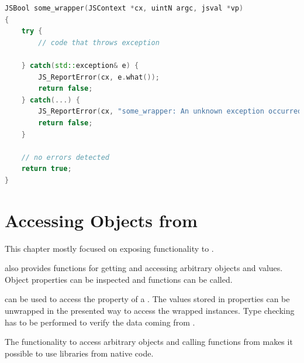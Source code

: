 \SingleSpacing
\begin{lstlisting}[language=C++, caption=Error handling at the language border]
JSBool some_wrapper(JSContext *cx, uintN argc, jsval *vp)
{
	try {
		// code that throws exception
		
	} catch(std::exception& e) {
		JS_ReportError(cx, e.what());
		return false;
	} catch(...) {
		JS_ReportError(cx, "some_wrapper: An unknown exception occurred");
		return false;
	}
	
	// no errors detected
	return true;
}
\end{lstlisting}
\OnehalfSpacing

\section{Accessing  Objects from }

This chapter mostly focused on exposing  functionality to .

 also provides functions for getting and accessing arbitrary  objects and values. Object properties can be inspected and  functions can be called.

 can be used to access the property of a . The values stored in properties can be unwrapped in the presented way to access the wrapped  instances. Type checking has to be performed to verify the data coming from .

The functionality to access arbitrary  objects and calling  \linebreak functions from  makes it possible to use  libraries from native code.